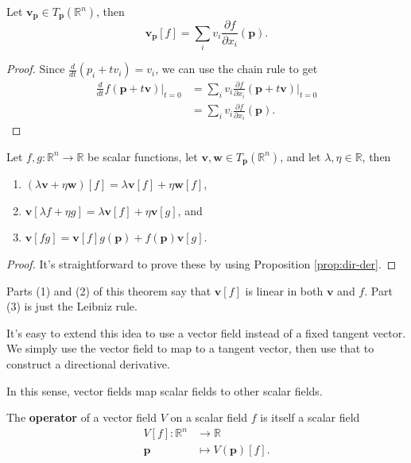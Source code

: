 \documentclass[10pt]{report}
\begin{document}
\begin{prop}
	\label{prop:dir-der}
	Let $\mathbf{v}_\mathbf{p} \in T_\mathbf{p}(\mathbb{R}^n)$, then
	\[
		\mathbf{v}_{\mathbf{p}}[f] = \sum_i v_i \frac{\partial f}{\partial x_i} (\mathbf{p}).
	\] 
\end{prop}
\begin{proof}
	Since $\frac{d }{d t} (p_i + tv_i) = v_i$, we can use the chain rule to get
	\begin{align*}
		\frac{d }{d t} f(\mathbf{p}+t\mathbf{v}) \Big|_{t=0} &= \sum_{i} v_i \frac{\partial f}{\partial x_i} (\mathbf{p}+t\mathbf{v}) \Big|_{t=0} \\
						   &= \sum_i v_i \frac{\partial f}{\partial x_i} (\mathbf{p}).
	\end{align*}
\end{proof}

\begin{thrm}
	\label{thrm:props-of-dir-der}
	Let $f,g:\mathbb{R}^n \to \mathbb{R}$ be scalar functions, let $\mathbf{v},\mathbf{w} \in T_\mathbf{p}(\mathbb{R}^n)$, and let $\lambda,\eta\in\mathbb{R}$, then
	\begin{enumerate}
		\item $(\lambda \mathbf{v} + \eta \mathbf{w})[f] = \lambda \mathbf{v}[f] + \eta \mathbf{w}[f]$,
		\item $\mathbf{v}[\lambda f + \eta g] = \lambda \mathbf{v}[f] + \eta \mathbf{v}[g]$, and
		\item $\mathbf{v}[fg] = \mathbf{v}[f] g(\mathbf{p}) + f(\mathbf{p}) \mathbf{v}[g]$.
	\end{enumerate}
\end{thrm}
\begin{proof}
	It's straightforward to prove these by using Proposition \ref{prop:dir-der}.
\end{proof}

Parts (1) and (2) of this theorem say that $\mathbf{v}[f]$ is linear in both $\mathbf{v}$ and $f$. Part (3) is just the Leibniz rule.

It's easy to extend this idea to use a vector field instead of a fixed tangent vector. We simply use the vector field to map to a tangent vector, then use that to construct a directional derivative.

\begin{note}
In this sense, vector fields map scalar fields to other scalar fields.
\end{note}

\begin{defn}
	The \textbf{operator} of a vector field $V$ on a scalar field $f$ is itself a scalar field
	\begin{align*}
		V[f]: \mathbb{R}^n &\to \mathbb{R} \\
		\mathbf{p} &\mapsto V(\mathbf{p})[f].
	\end{align*}
\end{defn}
\end{document}

